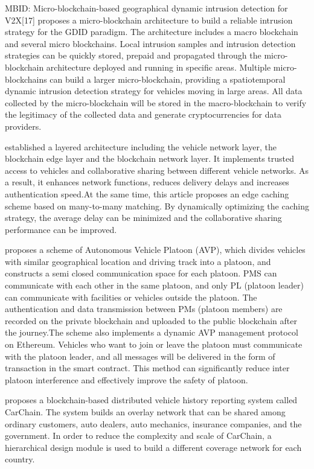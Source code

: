 MBID: Micro-blockchain-based geographical dynamic intrusion detection for V2X[17] proposes a micro-blockchain architecture to build a reliable intrusion strategy for the GDID paradigm. The architecture includes a macro blockchain and several micro blockchains. Local intrusion samples and intrusion detection strategies can be quickly stored, prepaid and propagated through the micro-blockchain architecture deployed and running in specific areas. Multiple micro-blockchains can build a larger micro-blockchain, providing a spatiotemporal dynamic intrusion detection strategy for vehicles moving in large areas. All data collected by the micro-blockchain will be stored in the macro-blockchain to verify the legitimacy of the collected data and generate cryptocurrencies for data providers.

\cite{ref28} established a layered architecture including the vehicle network layer, the blockchain edge layer and the blockchain network layer. It implements trusted access to vehicles and collaborative sharing between different vehicle networks. As a result, it enhances network functions, reduces delivery delays and increases authentication speed.At the same time, this article proposes an edge caching scheme based on many-to-many matching. By dynamically optimizing the caching strategy, the average delay can be minimized and the collaborative sharing performance can be improved.

\cite{ref45} proposes a scheme of Autonomous Vehicle Platoon (AVP), which divides vehicles with similar geographical location and driving track into a platoon, and constructs a semi closed communication space for each platoon. PMS can communicate with each other in the same platoon, and only PL (platoon leader) can communicate with facilities or vehicles outside the platoon. The authentication and data transmission between PMs (platoon members) are recorded on the private blockchain and uploaded to the public blockchain after the journey.The scheme also implements a dynamic AVP management protocol on Ethereum. Vehicles who want to join or leave the platoon must communicate with the platoon leader, and all messages will be delivered in the form of transaction in the smart contract. This method can significantly reduce inter platoon interference and effectively improve the safety of platoon.

\cite{ref47} proposes a blockchain-based distributed vehicle history reporting system called CarChain. The system builds an overlay network that can be shared among ordinary customers, auto dealers, auto mechanics, insurance companies, and the government. In order to reduce the complexity and scale of CarChain, a hierarchical design module is used to build a different coverage network for each country.

